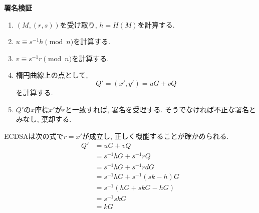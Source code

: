 \begin{breakitembox}[l]{\textbf{署名検証}}
  　
  \begin{enumerate}[parsep=7pt]
    \item $(M,(r,s))$を受け取り, $h=H(M)$を計算する. 
    \item $u\equiv s^{-1}h\pmod n$を計算する.
    \item $v\equiv s^{-1}r\pmod n$を計算する.
    \item 楕円曲線上の点として,
    \begin{equation}
      Q'=(x',y')=uG+vQ
    \end{equation}
    を計算する.
    \item $Q'$の$x$座標$x'$が$r$と一致すれば, 署名を受理する.
    そうでなければ不正な署名とみなし, 棄却する.
  \end{enumerate}
\end{breakitembox}
\vspace{1em}
\indent ECDSAは次の式で$r=x'$が成立し, 正しく機能することが確かめられる.\\
\begin{align*}
  Q'  &= uG + vQ\\
      &= s^{-1}hG + s^{-1}rQ \\
      &= s^{-1}hG + s^{-1}rdG \\
      &= s^{-1}hG + s^{-1}(sk-h)G \\
      &= s^{-1}(hG + skG - hG) \\
      &= s^{-1}skG \\
      &= kG
\end{align*}
